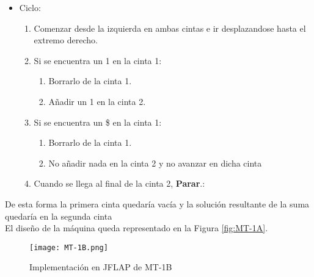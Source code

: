 \begin{itemize}
    \item Ciclo:
    \begin{enumerate}[1.]
        \item Comenzar desde la izquierda en ambas cintas e ir desplazandose hasta el extremo derecho.
        \item Si se encuentra un 1 en la cinta 1:
        \begin{enumerate}[1.]
            \item Borrarlo de la cinta 1.
            \item Añadir un 1 en la cinta 2.
        \end{enumerate}
        \item Si se encuentra un \$ en la cinta 1:
        \begin{enumerate}[1.]
            \item Borrarlo de la cinta 1.
            \item No añadir nada en la cinta 2 y no avanzar en dicha cinta
        \end{enumerate}
        \item Cuando se llega al final de la cinta 2, \textbf{Parar}.:
    \end{enumerate}
\end{itemize}
De esta forma la primera cinta quedaría vacía y la solución resultante de la suma quedaría en la segunda cinta\\

El diseño de la máquina queda representado en la Figura \ref{fig:MT-1A}.

\begin{figure}[h]
    \texttt{[image: MT-1B.png]}
    \caption{Implementación en JFLAP de MT-1B}
    \label{fig:MT-1B}
\end{figure}
